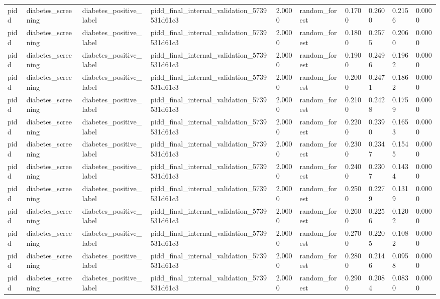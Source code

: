 \begin{tabular}{llllllllll}
pidd & diabetes\_screening & diabetes\_positive\_label & pidd\_final\_internal\_validation\_5739531d61c3 & 2.0000 & random\_forest & 0.1700 & 0.2600 & 0.2156 & 0.0000 \\
pidd & diabetes\_screening & diabetes\_positive\_label & pidd\_final\_internal\_validation\_5739531d61c3 & 2.0000 & random\_forest & 0.1800 & 0.2575 & 0.2060 & 0.0000 \\
pidd & diabetes\_screening & diabetes\_positive\_label & pidd\_final\_internal\_validation\_5739531d61c3 & 2.0000 & random\_forest & 0.1900 & 0.2496 & 0.1962 & 0.0000 \\
pidd & diabetes\_screening & diabetes\_positive\_label & pidd\_final\_internal\_validation\_5739531d61c3 & 2.0000 & random\_forest & 0.2000 & 0.2471 & 0.1862 & 0.0000 \\
pidd & diabetes\_screening & diabetes\_positive\_label & pidd\_final\_internal\_validation\_5739531d61c3 & 2.0000 & random\_forest & 0.2100 & 0.2428 & 0.1759 & 0.0000 \\
pidd & diabetes\_screening & diabetes\_positive\_label & pidd\_final\_internal\_validation\_5739531d61c3 & 2.0000 & random\_forest & 0.2200 & 0.2390 & 0.1653 & 0.0000 \\
pidd & diabetes\_screening & diabetes\_positive\_label & pidd\_final\_internal\_validation\_5739531d61c3 & 2.0000 & random\_forest & 0.2300 & 0.2347 & 0.1545 & 0.0000 \\
pidd & diabetes\_screening & diabetes\_positive\_label & pidd\_final\_internal\_validation\_5739531d61c3 & 2.0000 & random\_forest & 0.2400 & 0.2307 & 0.1434 & 0.0000 \\
pidd & diabetes\_screening & diabetes\_positive\_label & pidd\_final\_internal\_validation\_5739531d61c3 & 2.0000 & random\_forest & 0.2500 & 0.2279 & 0.1319 & 0.0000 \\
pidd & diabetes\_screening & diabetes\_positive\_label & pidd\_final\_internal\_validation\_5739531d61c3 & 2.0000 & random\_forest & 0.2600 & 0.2256 & 0.1202 & 0.0000 \\
pidd & diabetes\_screening & diabetes\_positive\_label & pidd\_final\_internal\_validation\_5739531d61c3 & 2.0000 & random\_forest & 0.2700 & 0.2205 & 0.1082 & 0.0000 \\
pidd & diabetes\_screening & diabetes\_positive\_label & pidd\_final\_internal\_validation\_5739531d61c3 & 2.0000 & random\_forest & 0.2800 & 0.2146 & 0.0958 & 0.0000 \\
pidd & diabetes\_screening & diabetes\_positive\_label & pidd\_final\_internal\_validation\_5739531d61c3 & 2.0000 & random\_forest & 0.2900 & 0.2084 & 0.0830 & 0.0000 \\

\end{tabular}
